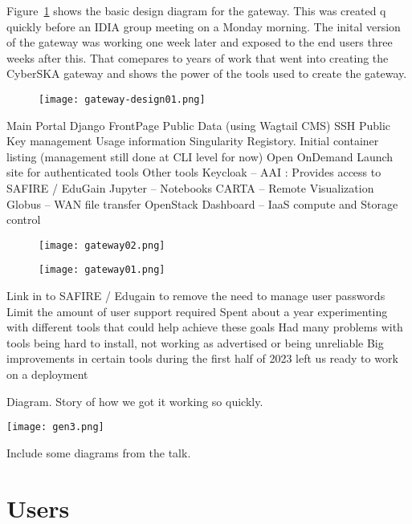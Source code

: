 \documentclass[12pt,twocolumn,a4paper]{article}
\begin{document}
Figure~\ref{fig:gateway_design} shows the basic design diagram for the gateway. This was created q
quickly before an IDIA group meeting on a Monday morning. The inital version of the gateway was working one week later and
exposed to the end users three weeks after this. That comepares to years of work that went into creating the CyberSKA gateway
and shows the power of the tools used to create the gateway.


\begin{figure}
    \texttt{[image: gateway-design01.png]}
    \caption{}
    \label{fig:gateway_design}
\end{figure}


Main Portal
Django
FrontPage
Public Data (using Wagtail CMS)
SSH Public Key management
Usage information
Singularity Registory.
Initial container listing (management still done at CLI level for now)
Open OnDemand
Launch site for authenticated tools
Other tools
Keycloak – AAI : Provides access to SAFIRE / EduGain
Jupyter – Notebooks
CARTA – Remote Visualization
Globus – WAN file transfer
OpenStack Dashboard – IaaS compute and Storage control




\begin{figure}
\texttt{[image: gateway02.png]}
\end{figure}

\begin{figure}
    \texttt{[image: gateway01.png]}
\end{figure}
    

Link in to SAFIRE / Edugain to remove the need to manage user passwords
Limit the amount of user support required
Spent about a year experimenting with different tools that could help achieve these goals
Had many problems with tools being hard to install, not working as advertised or being unreliable
Big improvements in certain tools during the first half of 2023 left us ready to work on a deployment

Diagram.
Story of how we got it working so quickly.

\texttt{[image: gen3.png]}




Include some diagrams from the talk.


\section{Users}
\label{sec:users}
\end{document}
